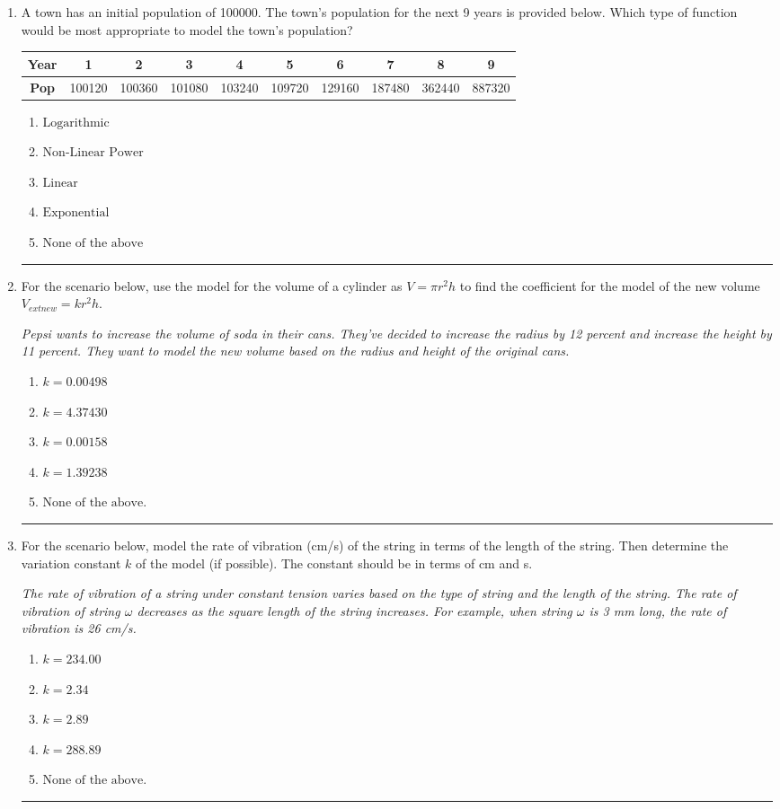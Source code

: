 \documentclass[14pt]{extbook}
\newcommand{\litem}[1]{\item#1\hspace*{-1cm}\rule{\textwidth}{0.4pt}}
\begin{document}
\begin{enumerate}
{\begin{enumerate}[label=\Alph*.]
\end{enumerate} }
\litem{
A town has an initial population of 100000. The town's population for the next 9 years is provided below. Which type of function would be most appropriate to model the town's population?

\begin{tabular}{c|c|c|c|c|c|c|c|c|c}
\textbf{Year} &1 &2 &3 &4 &5 &6 &7 &8 &9\tabularnewline \hline
\textbf{Pop} &100120 &100360 &101080 &103240 &109720 &129160 &187480 &362440 &887320\end{tabular}\begin{enumerate}[label=\Alph*.]
\item \( \text{Logarithmic} \)
\item \( \text{Non-Linear Power} \)
\item \( \text{Linear} \)
\item \( \text{Exponential} \)
\item \( \text{None of the above} \)

\end{enumerate} }
\litem{
For the scenario below, use the model for the volume of a cylinder as $V = \pi r^2 h$ to find the coefficient for the model of the new volume $V_{	ext{new}} = k r^2 h$.
\begin{center}
    \textit{ Pepsi wants to increase the volume of soda in their cans. They've decided to increase the radius by 12 percent and increase the height by 11 percent. They want to model the new volume based on the radius and height of the original cans. }
\end{center}
\begin{enumerate}[label=\Alph*.]
\item \( k = 0.00498 \)
\item \( k = 4.37430 \)
\item \( k = 0.00158 \)
\item \( k = 1.39238 \)
\item \( \text{None of the above.} \)

\end{enumerate} }
\litem{
For the scenario below, model the rate of vibration (cm/s) of the string in terms of the length of the string. Then determine the variation constant $k$ of the model (if possible). The constant should be in terms of cm and s.
\begin{center}
    \textit{ The rate of vibration of a string under constant tension varies based on the type of string and the length of the string. The rate of vibration of string $\omega$ decreases as the square length of the string increases. For example, when string $\omega$ is 3 mm long, the rate of vibration is 26 cm/s. }
\end{center}
\begin{enumerate}[label=\Alph*.]
\item \( k = 234.00 \)
\item \( k = 2.34 \)
\item \( k = 2.89 \)
\item \( k = 288.89 \)
\item \( \text{None of the above.} \)


\end{enumerate}}
\end{enumerate}
\end{document}
